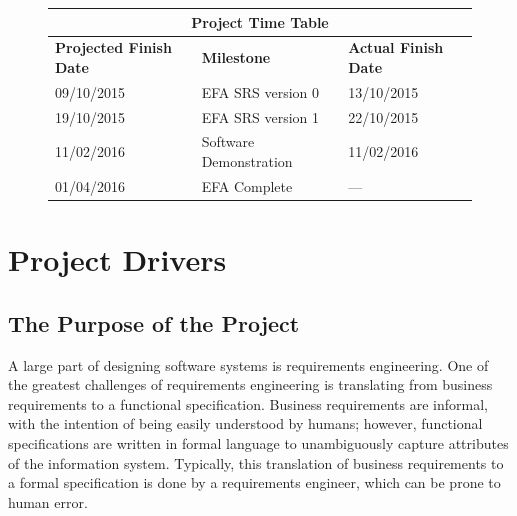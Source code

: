 \documentclass[12pt]{report}
\begin{document}
\newpage

\tableofcontents
\listoffigures
\listoftables

\newpage
{} %

\setlength{\arrayrulewidth}{0.35mm}
\setlength{\tabcolsep}{16pt}
\renewcommand{\arraystretch}{2}
\begin{figure}
	\begin{adjustwidth}{-1cm}{}
	\begin{tabular}{ |m{4cm}|m{6cm}|m{4cm}|  }
		\hline
		\multicolumn{3}{|c|}{\bfseries{Project Time Table}} \\
		\hline
		\bfseries{Projected Finish Date}& \bfseries{Milestone} & 
		\bfseries{Actual Finish Date} \\
		\hline
		 09/10/2015& EFA SRS version 0 & 13/10/2015 \\
		19/10/2015 & EFA SRS version 1  & 22/10/2015 \\
		11/02/2016 & Software Demonstration & 11/02/2016 \\
        01/04/2016 & EFA Complete & --- \\
		\hline
	\end{tabular}
	\end{adjustwidth}
\end{figure}
\chapter{Project Drivers}\label{ch:Intro}
{\section{The Purpose of the Project}\label{sec:Purpose}}

A large part of designing software systems is requirements engineering. One
of the greatest challenges of requirements engineering is translating from
business requirements to a functional specification. Business requirements are
informal, with the intention of being easily understood by humans; however,
functional specifications are written in formal language to unambiguously capture attributes of the 
information system. Typically, this translation
of business requirements to a formal specification is done by a requirements
engineer, which can be prone to human error.
\end{document}

